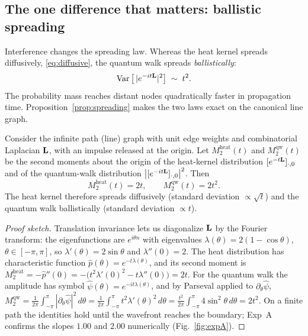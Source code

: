 \subsection{The one difference that matters: ballistic spreading}
Interference changes the spreading law. Whereas the heat kernel spreads diffusively,
\eqref{eq:diffusive}, the quantum walk spreads \emph{ballistically}:
\begin{equation}
\operatorname{Var}\big[\,|e^{-it\mathbf{L}}|^2\big]\;\sim\;t^2 .
\label{eq:ballistic}
\end{equation}
The probability mass reaches distant nodes quadratically faster in propagation time.
Proposition~\ref{prop:spreading} makes the two laws exact on the canonical line graph.

\begin{proposition}
\label{prop:spreading}
Consider the infinite path (line) graph with unit edge weights and combinatorial
Laplacian $\mathbf{L}$, with an impulse released at the origin. Let $M_2^{\mathrm{heat}}(t)$ and
$M_2^{\mathrm{qw}}(t)$ be the second moments about the origin of the heat-kernel
distribution $[e^{-t\mathbf{L}}]_{\cdot,0}$ and of the quantum-walk distribution
$\big|[e^{-it\mathbf{L}}]_{\cdot,0}\big|^2$. Then
\begin{equation}
M_2^{\mathrm{heat}}(t)=2t, \qquad M_2^{\mathrm{qw}}(t)=2t^2 .
\end{equation}
The heat kernel therefore spreads diffusively (standard deviation $\propto\sqrt{t}$) and
the quantum walk ballistically (standard deviation $\propto t$).
\end{proposition}

\begin{proof}[Proof sketch]
Translation invariance lets us diagonalize $\mathbf{L}$ by the Fourier transform: the
eigenfunctions are $e^{i\theta n}$ with eigenvalues $\lambda(\theta)=2(1-\cos\theta)$,
$\theta\in[-\pi,\pi]$, so $\lambda'(\theta)=2\sin\theta$ and $\lambda''(0)=2$. The heat
distribution has characteristic function $\hat p(\theta)=e^{-t\lambda(\theta)}$, and its
second moment is $M_2^{\mathrm{heat}}=-\hat p''(0)=-\big(t^2\lambda'(0)^2-t\lambda''(0)\big)=2t$.
For the quantum walk the amplitude has symbol $\hat\psi(\theta)=e^{-it\lambda(\theta)}$, and
by Parseval applied to $\partial_\theta\hat\psi$,
$M_2^{\mathrm{qw}}=\tfrac{1}{2\pi}\!\int_{-\pi}^{\pi}\!|\partial_\theta\hat\psi|^2\,d\theta
=\tfrac{1}{2\pi}\!\int_{-\pi}^{\pi}\! t^2\lambda'(\theta)^2\,d\theta
=\tfrac{t^2}{2\pi}\!\int_{-\pi}^{\pi}\!4\sin^2\theta\,d\theta=2t^2$.
On a finite path the identities hold until the wavefront reaches the boundary; Exp~A
confirms the slopes $1.00$ and $2.00$ numerically (Fig.~\ref{fig:expA}).
\end{proof}

